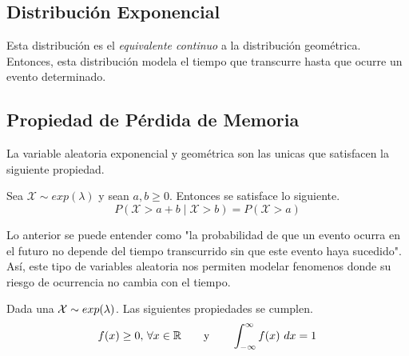 \subsection{Distribución Exponencial}
Esta distribución es el \textit{equivalente continuo} a la distribución geométrica. Entonces, esta distribución modela el tiempo que transcurre hasta que ocurre un evento determinado.


\subsection{Propiedad de Pérdida de Memoria}

La variable aleatoria exponencial y geométrica son las unicas que satisfacen la siguiente propiedad.

Sea $\mathcal X \sim exp(\lambda)$ y sean $a,b \ge 0$. Entonces se satisface lo siguiente.
\[P(\mathcal X > a + b \mid \mathcal X > b) = P(\mathcal X > a)\]

Lo anterior se puede entender como "la probabilidad de que un evento ocurra en el futuro no depende del tiempo transcurrido sin que este evento haya sucedido". Así, este tipo de variables aleatoria nos permiten modelar fenomenos donde su riesgo de ocurrencia no cambia con el tiempo.



Dada una $\mathcal{X} \sim exp(\lambda)$. Las siguientes propiedades se cumplen.
\[
  f(x) \ge 0,\, \forall x \in \mathbb{R} \qquad \text{y} \qquad \int_{-\infty}^{\infty} f(x)~dx = 1
\]

